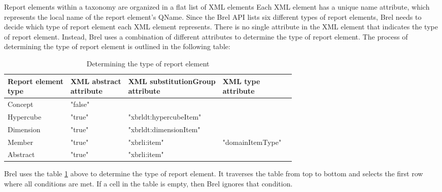 Report elements within a taxonomy are organized in a flat list of XML elements
Each XML element has a unique name attribute, which represents the local name of the report element's QName.
Since the Brel API lists six different types of report elements, Brel needs to decide which type of report element each XML element represents.
There is no single attribute in the XML element that indicates the type of report element.
Instead, Brel uses a combination of different attributes to determine the type of report element.
The process of determining the type of report element is outlined in the following table:

\begin{table}[H]
    \centering
    \begin{tabular}{|l|l|l|l|l|}
        \hline
        \makecell[l]{\textbf{Report element} \\ \textbf{type}}  & 
        \makecell[l]{\textbf{XML abstract} \\ \textbf{attribute}} &
        \makecell[l]{\textbf{XML substitutionGroup} \\ \textbf{attribute}} & 
        \makecell[l]{\textbf{XML type} \\ \textbf{attribute}} \\ \hline
        Concept     & "false"   &                                      &                            \\ \hline
        Hypercube   & "true"    & "xbrldt:hypercubeItem"                &                            \\ \hline
        Dimension   & "true"    & "xbrldt:dimensionItem"                &                            \\ \hline
        Member      & "true"    & "xbrli:item"                          & "domainItemType" \\ \hline
        Abstract    & "true"    & "xbrli:item"                          &                            \\ \hline
    \end{tabular}
    \caption{Determining the type of report element}
    \label{tab:determining_report_element_type}
\end{table}

Brel uses the table \ref{tab:determining_report_element_type} above to determine the type of report element.
It traverses the table from top to bottom and selects the first row where all conditions are met.
If a cell in the table is empty, then Brel ignores that condition. 

